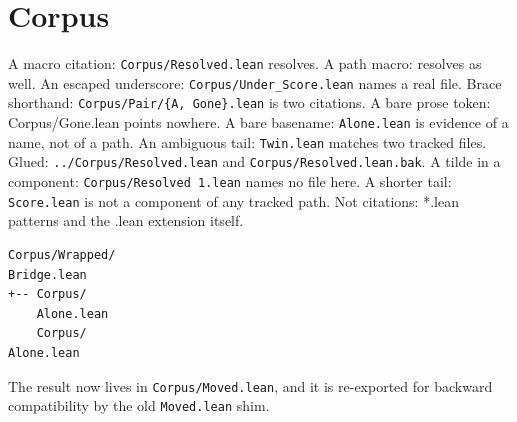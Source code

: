 \section{Corpus}

A macro citation: \texttt{Corpus/Resolved.lean} resolves.
A path macro:  resolves as well.
An escaped underscore: \texttt{Corpus/Under\_Score.lean} names a real file.
Brace shorthand: \texttt{Corpus/Pair/\{A, Gone\}.lean} is two citations.
A bare prose token: Corpus/Gone.lean points nowhere.
A bare basename: \texttt{Alone.lean} is evidence of a name, not of a path.
An ambiguous tail: \texttt{Twin.lean} matches two tracked files.
Glued: \texttt{../Corpus/Resolved.lean} and \texttt{Corpus/Resolved.lean.bak}.
A tilde in a component: \texttt{Corpus/Resolved~1.lean} names no file here.
A shorter tail: \texttt{Score.lean} is not a component of any tracked path.
Not citations: *.lean patterns and the .lean extension itself.

\begin{Verbatim}
Corpus/Wrapped/
Bridge.lean
+-- Corpus/
    Alone.lean
    Corpus/
Alone.lean
\end{Verbatim}

The result now lives in \texttt{Corpus/Moved.lean},
and it is re-exported for backward compatibility by
the old \texttt{Moved.lean} shim.
